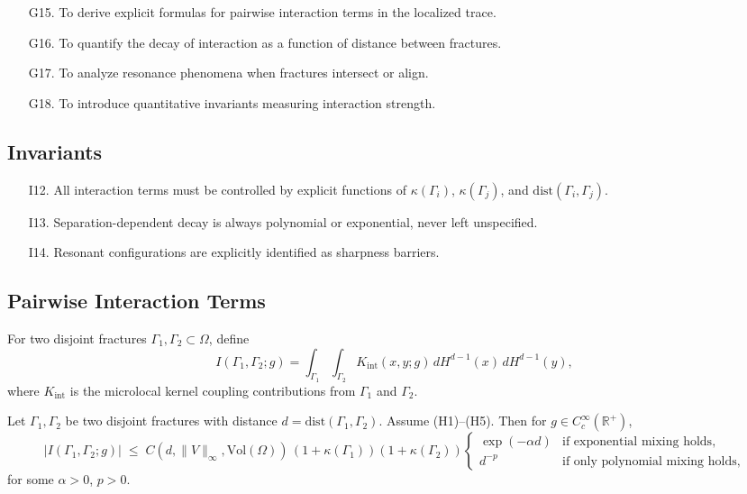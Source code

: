 \begin{itemize}
  \item[G15.] To derive explicit formulas for pairwise interaction terms in the localized trace. 
  \item[G16.] To quantify the decay of interaction as a function of distance between fractures. 
  \item[G17.] To analyze resonance phenomena when fractures intersect or align. 
  \item[G18.] To introduce quantitative invariants measuring interaction strength. 
\end{itemize}

\subsection*{Invariants}

\begin{itemize}
  \item[I12.] All interaction terms must be controlled by explicit functions of $\kappa(\Gamma_i)$, $\kappa(\Gamma_j)$, and $\mathrm{dist}(\Gamma_i,\Gamma_j)$. 
  \item[I13.] Separation-dependent decay is always polynomial or exponential, never left unspecified. 
  \item[I14.] Resonant configurations are explicitly identified as sharpness barriers. 
\end{itemize}

\subsection{Pairwise Interaction Terms}

\begin{definition}
\label{def:interaction-coefficient}
For two disjoint fractures $\Gamma_1,\Gamma_2 \subset \Omega$, define
\[
I(\Gamma_1,\Gamma_2;g)
=
\int_{\Gamma_1}\int_{\Gamma_2}
K_{\mathrm{int}}(x,y;g)\,
dH^{d-1}(x)\,dH^{d-1}(y),
\]
where $K_{\mathrm{int}}$ is the microlocal kernel coupling contributions from $\Gamma_1$ and $\Gamma_2$. 
\end{definition}

\begin{theorem}
\label{thm:interaction-decay}
Let $\Gamma_1,\Gamma_2$ be two disjoint fractures with distance $d=\mathrm{dist}(\Gamma_1,\Gamma_2)$. 
Assume (H1)--(H5). Then for $g\in C_c^\infty(\mathbb{R}^+)$,
\[
|I(\Gamma_1,\Gamma_2;g)| 
\;\leq\; 
C(d,\|V\|_\infty,\mathrm{Vol}(\Omega)) 
\,(1+\kappa(\Gamma_1))(1+\kappa(\Gamma_2))
\begin{cases}
\exp(-\alpha d) & \text{if exponential mixing holds},\\[1ex]
d^{-p} & \text{if only polynomial mixing holds},
\end{cases}
\]
for some $\alpha>0$, $p>0$. 
\end{theorem}


